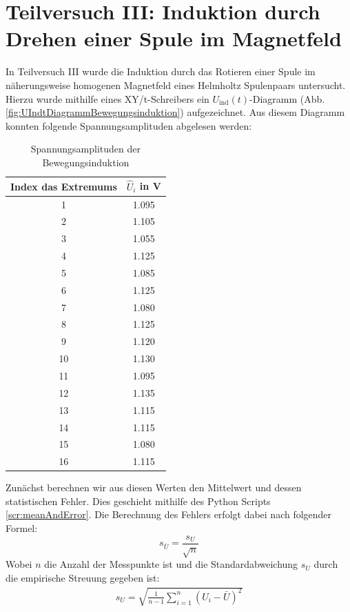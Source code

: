 \documentclass{report}
\begin{document}
\section{Teilversuch III: Induktion durch Drehen einer Spule im Magnetfeld}
In Teilversuch III wurde die Induktion durch das Rotieren einer Spule im näherungsweise homogenen Magnetfeld eines Helmholtz Spulenpaars untersucht.
Hierzu wurde mithilfe eines XY/t-Schreibers ein $U_{\mathrm{ind}}(t)$-Diagramm (Abb. \ref{fig:UIndtDiagrammBewegungsinduktion}) aufgezeichnet.
Aus diesem Diagramm konnten folgende Spannungsamplituden abgelesen werden:
\begin{table}[H]
    \centering
    \caption{Spannungsamplituden der Bewegungsinduktion}
    \label{tab:AmpBewInd}
    \begin{tabular}{c c}
        \hline
        Index das Extremums & $\hat{U}_i$ in \si{V}\\
        \hline
        1 &  1.095\\
        2 &  1.105\\
        3 &  1.055\\
        4 &  1.125\\
        5 &  1.085\\
        6 &  1.125\\
        7 &  1.080\\
        8 &  1.125\\
        9 &  1.120\\
        10 &  1.130\\
        11 &  1.095\\
        12 &  1.135\\
        13 &  1.115\\
        14 &  1.115\\
        15 &  1.080\\
        16 &  1.115
    \end{tabular}
\end{table}
\noindent
Zunächst berechnen wir aus diesen Werten den Mittelwert und dessen statistischen Fehler. Dies geschieht mithilfe des Python Scripts \ref{scr:meanAndError}.
Die Berechnung des Fehlers erfolgt dabei nach folgender Formel:
\begin{equation}
    s_{\bar{U}} = \frac{s_{U}}{\sqrt{n}}
\end{equation}
Wobei $n$ die Anzahl der Messpunkte ist und die Standardabweichung $s_U$ durch die empirische Streuung gegeben ist:
\begin{equation}
    \begin{split}
        s_U = \sqrt{\frac{1}{n-1}\sum_{i=1}^{n} (U_i - \bar{U})^2}
    \end{split}
\end{equation}
\end{document}
